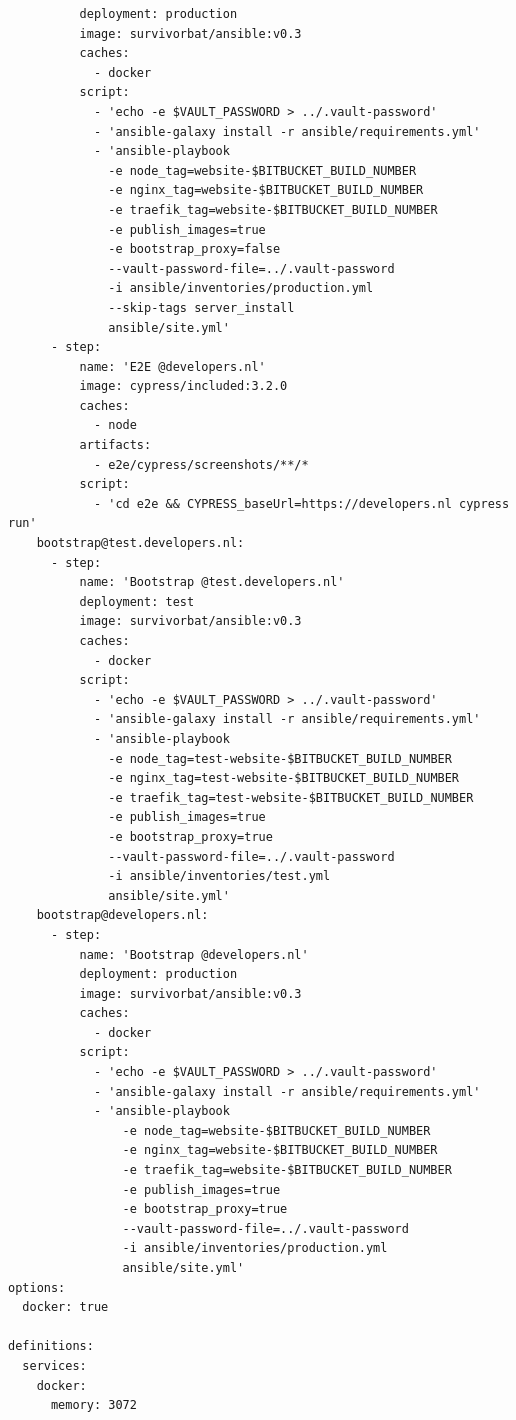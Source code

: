 \begin{verbatim}
          deployment: production
          image: survivorbat/ansible:v0.3
          caches:
            - docker
          script:
            - 'echo -e $VAULT_PASSWORD > ../.vault-password'
            - 'ansible-galaxy install -r ansible/requirements.yml'
            - 'ansible-playbook
              -e node_tag=website-$BITBUCKET_BUILD_NUMBER
              -e nginx_tag=website-$BITBUCKET_BUILD_NUMBER
              -e traefik_tag=website-$BITBUCKET_BUILD_NUMBER
              -e publish_images=true
              -e bootstrap_proxy=false
              --vault-password-file=../.vault-password
              -i ansible/inventories/production.yml
              --skip-tags server_install
              ansible/site.yml'
      - step:
          name: 'E2E @developers.nl'
          image: cypress/included:3.2.0
          caches:
            - node
          artifacts:
            - e2e/cypress/screenshots/**/*
          script:
            - 'cd e2e && CYPRESS_baseUrl=https://developers.nl cypress run'
    bootstrap@test.developers.nl:
      - step:
          name: 'Bootstrap @test.developers.nl'
          deployment: test
          image: survivorbat/ansible:v0.3
          caches:
            - docker
          script:
            - 'echo -e $VAULT_PASSWORD > ../.vault-password'
            - 'ansible-galaxy install -r ansible/requirements.yml'
            - 'ansible-playbook
              -e node_tag=test-website-$BITBUCKET_BUILD_NUMBER
              -e nginx_tag=test-website-$BITBUCKET_BUILD_NUMBER
              -e traefik_tag=test-website-$BITBUCKET_BUILD_NUMBER
              -e publish_images=true
              -e bootstrap_proxy=true
              --vault-password-file=../.vault-password
              -i ansible/inventories/test.yml
              ansible/site.yml'
    bootstrap@developers.nl:
      - step:
          name: 'Bootstrap @developers.nl'
          deployment: production
          image: survivorbat/ansible:v0.3
          caches:
            - docker
          script:
            - 'echo -e $VAULT_PASSWORD > ../.vault-password'
            - 'ansible-galaxy install -r ansible/requirements.yml'
            - 'ansible-playbook
                -e node_tag=website-$BITBUCKET_BUILD_NUMBER
                -e nginx_tag=website-$BITBUCKET_BUILD_NUMBER
                -e traefik_tag=website-$BITBUCKET_BUILD_NUMBER
                -e publish_images=true
                -e bootstrap_proxy=true
                --vault-password-file=../.vault-password
                -i ansible/inventories/production.yml
                ansible/site.yml'
options:
  docker: true

definitions:
  services:
    docker:
      memory: 3072
\end{verbatim}


